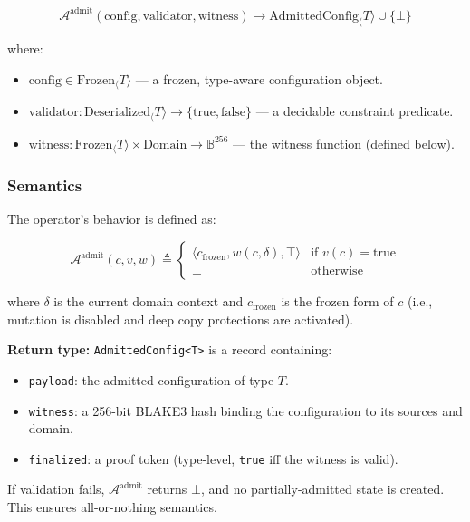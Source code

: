 \documentclass[11pt]{article}
\begin{document}
\begin{equation}
\mathcal{A}^\text{admit}(\text{config}, \text{validator}, \text{witness}) \to \text{AdmittedConfig}_\langle T \rangle \cup \{\bot\}
\end{equation}

\noindent where:
\begin{itemize}
  \item $\text{config} \in \text{Frozen}_\langle T \rangle$ — a frozen, type-aware configuration object.
  \item $\text{validator} : \text{Deserialized}_\langle T \rangle \to \{\text{true}, \text{false}\}$ — a decidable constraint predicate.
  \item $\text{witness} : \text{Frozen}_\langle T \rangle \times \text{Domain} \to \mathbb{B}^{256}$ — the witness function (defined below).
\end{itemize}

\subsubsection{Semantics}

The operator's behavior is defined as:

\begin{equation}
\mathcal{A}^\text{admit}(c, v, w) \triangleq
\begin{cases}
\langle c_{\text{frozen}}, w(c, \delta), \top \rangle & \text{if } v(c) = \text{true} \\
\bot & \text{otherwise}
\end{cases}
\end{equation}

\noindent where $\delta$ is the current domain context and $c_{\text{frozen}}$ is the frozen form of $c$ (i.e., mutation is disabled and deep copy protections are activated).

\textbf{Return type:} \texttt{AdmittedConfig<T>} is a record containing:
\begin{itemize}
  \item \texttt{payload}: the admitted configuration of type $T$.
  \item \texttt{witness}: a 256-bit BLAKE3 hash binding the configuration to its sources and domain.
  \item \texttt{finalized}: a proof token (type-level, \texttt{true} iff the witness is valid).
\end{itemize}

\noindent If validation fails, $\mathcal{A}^\text{admit}$ returns $\bot$, and no partially-admitted state is created. This ensures all-or-nothing semantics.
\end{document}
